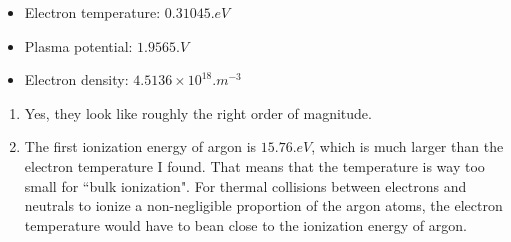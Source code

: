 \documentclass{article}
\begin{document}
\begin{itemize}
    \item Electron temperature: $0.31045 \si{.eV}$
    \item Plasma potential: $1.9565 \si{.V}$
    \item Electron density: $4.5136 \times 10^{18} \si{.m^{-3}}$
\end{itemize}

\bigskip
\par
\begin{prob}
\end{prob}
\begin{enumerate}[label=(\alph*)]
    \item Yes, they look like roughly the right order of magnitude.
    \item The first ionization energy of argon is $15.76 \si{.eV}$, which is much larger than the electron temperature I found. That means that the temperature is way too small for ``bulk ionization". For thermal collisions between electrons and neutrals to ionize a non-negligible proportion of the argon atoms, the electron temperature would have to bean close to the ionization energy of argon.
\end{enumerate}



\end{document}
